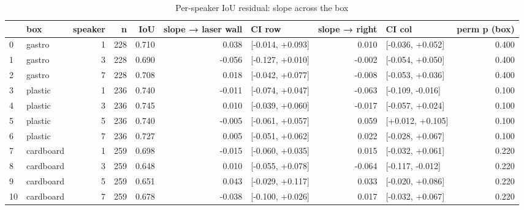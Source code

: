 \begin{table}
\caption{Per-speaker IoU residual: slope across the box}
\label{tab:speaker_residual}
\begin{tabular}{llrrrrlrlr}
\toprule
 & box & speaker & n & IoU & slope → laser wall & CI row & slope → right & CI col & perm p (box) \\
\midrule
0 & gastro & 1 & 228 & 0.710 & 0.038 & [-0.014, +0.093] & 0.010 & [-0.036, +0.052] & 0.400 \\
1 & gastro & 3 & 228 & 0.690 & -0.056 & [-0.127, +0.010] & -0.002 & [-0.054, +0.050] & 0.400 \\
2 & gastro & 7 & 228 & 0.708 & 0.018 & [-0.042, +0.077] & -0.008 & [-0.053, +0.036] & 0.400 \\
3 & plastic & 1 & 236 & 0.740 & -0.011 & [-0.074, +0.047] & -0.063 & [-0.109, -0.016] & 0.100 \\
4 & plastic & 3 & 236 & 0.745 & 0.010 & [-0.039, +0.060] & -0.017 & [-0.057, +0.024] & 0.100 \\
5 & plastic & 5 & 236 & 0.740 & -0.005 & [-0.061, +0.057] & 0.059 & [+0.012, +0.105] & 0.100 \\
6 & plastic & 7 & 236 & 0.727 & 0.005 & [-0.051, +0.062] & 0.022 & [-0.028, +0.067] & 0.100 \\
7 & cardboard & 1 & 259 & 0.698 & -0.015 & [-0.060, +0.035] & 0.015 & [-0.032, +0.061] & 0.220 \\
8 & cardboard & 3 & 259 & 0.648 & 0.010 & [-0.055, +0.078] & -0.064 & [-0.117, -0.012] & 0.220 \\
9 & cardboard & 5 & 259 & 0.651 & 0.043 & [-0.029, +0.117] & 0.033 & [-0.020, +0.086] & 0.220 \\
10 & cardboard & 7 & 259 & 0.678 & -0.038 & [-0.100, +0.026] & 0.017 & [-0.032, +0.067] & 0.220 \\
\bottomrule
\end{tabular}
\end{table}
